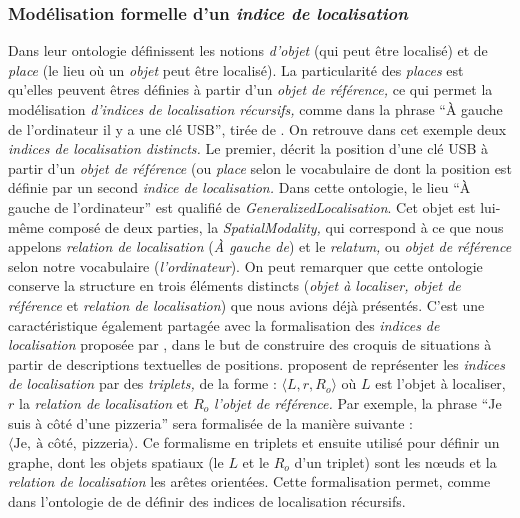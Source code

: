 \subsubsection{Modélisation formelle d'un \emph{indice de localisation}}

Dans leur ontologie \textcite{Bateman2010} définissent les notions
\emph{d'objet} (qui peut être localisé) et de \emph{place} (le lieu où
un \emph{objet} peut être localisé). La particularité des
\emph{places} est qu'elles peuvent êtres définies à partir d'un
\emph{objet de référence,} ce qui permet la modélisation
\emph{d'indices de localisation récursifs,} comme dans la phrase
\enquote{À gauche de l'ordinateur il y a une clé USB}, tirée de
\textcite{Bateman2010}. On retrouve dans cet exemple deux
\emph{indices de localisation distincts.} Le premier, décrit la
position d'une clé USB à partir d'un \emph{objet de référence} (ou
\emph{place} selon le vocabulaire de \textcite{Bateman2010} dont la
position est définie par un second \emph{indice de localisation.} Dans
cette ontologie, le lieu \enquote{À gauche de l'ordinateur} est
qualifié de \emph{GeneralizedLocalisation}. Cet objet est lui-même
composé de deux parties, la \emph{SpatialModality,} qui correspond à
ce que nous appelons \emph{relation de localisation} (\emph{À gauche
  de}) et le \emph{relatum,} ou \emph{objet de référence} selon notre
vocabulaire (\emph{l'ordinateur}). On peut remarquer que cette
ontologie conserve la structure en trois éléments distincts
(\emph{objet à localiser,} \emph{objet de référence} et \emph{relation
  de localisation}) que nous avions déjà présentés. C'est une
caractéristique également partagée avec la formalisation des
\emph{indices de localisation} proposée par \textcite{Vasardini2013},
dans le but de construire des croquis de situations à partir de
descriptions textuelles de positions. \textcite{Vasardini2013}
proposent de représenter les \emph{indices de localisation} par des
\emph{triplets,} de la forme : \(\langle L, r, R_o\rangle\) où \(L\)
est l'objet à localiser, \(r\) la \emph{relation de localisation} et
\(R_o\) \emph{l'objet de référence.} Par exemple, la phrase
\enquote{Je suis à côté d'une pizzeria} sera formalisée de la manière
suivante :
\(\langle \text{Je},\ \text{à côté},\ \text{pizzeria} \rangle\). Ce
formalisme en triplets et ensuite utilisé pour définir un graphe, dont
les objets spatiaux (\ie le \(L\) et le \(R_o\) d'un triplet) sont les
nœuds et la \emph{relation de localisation} les arêtes
orientées. Cette formalisation permet, comme dans l'ontologie de
\textcite{Bateman2010} de définir des indices de localisation
récursifs.

